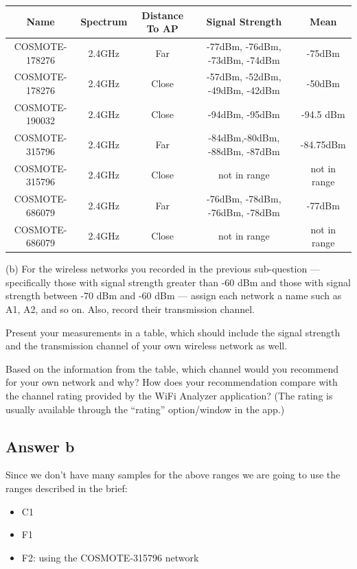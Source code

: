 \documentclass{article}
\begin{document}
\begin{center}
\begin{tabular}{| c | c | c | c | c |}
    \hline
     Name & Spectrum & Distance To AP & Signal Strength & Mean\\
     \hline
     COSMOTE-178276 &  2.4GHz & Far & -77dBm, -76dBm, -73dBm, -74dBm & -75dBm\\
     \hline
     COSMOTE-178276 &  2.4GHz & Close & -57dBm, -52dBm, -49dBm, -42dBm & -50dBm \\
     \hline
     COSMOTE-190032 &  2.4GHz & Close & -94dBm, -95dBm & -94.5 dBm\\
     \hline
     COSMOTE-315796 & 2.4GHz & Far & -84dBm,-80dBm, -88dBm, -87dBm & -84.75dBm\\
     \hline
     COSMOTE-315796 & 2.4GHz & Close & not in range & not in range\\
     \hline
     COSMOTE-686079 & 2.4GHz & Far & -76dBm, -78dBm, -76dBm, -78dBm & -77dBm\\
     \hline
     COSMOTE-686079 &  2.4GHz & Close & not in range  & not in range \\
     \hline
\end{tabular} 
\end{center}

\pagebreak 
(b) For the wireless networks you recorded in the previous sub-question — specifically those with signal strength greater than -60 dBm and those with signal strength between -70 dBm and -60 dBm — assign each network a name such as A1, A2, and so on.
Also, record their transmission channel.

Present your measurements in a table, which should include the signal strength and the transmission channel of your own wireless network as well.

Based on the information from the table, which channel would you recommend for your own network and why?
How does your recommendation compare with the channel rating provided by the WiFi Analyzer application?
(The rating is usually available through the “rating” option/window in the app.)


\subsection{Answer b}
Since we don't have many samples for the above ranges we are going to use the ranges described in the brief: 

\begin{itemize}
    \item C1
    \item F1
    \item F2: using the COSMOTE-315796 network
\end{itemize}
\end{document}
